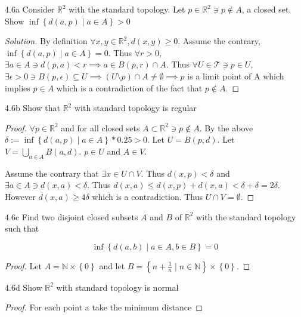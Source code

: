 \documentclass{article}
\newcommand*{\T}{\mathcal{T}}
\newcommand{\R}{\mathbb{R}}
\newcommand{\N}{\mathbb{N}}
\newenvironment{solution}
{\renewcommand\qedsymbol{$\blacksquare$}\begin{proof}[Solution]}
{\end{proof}}
\begin{document}
\begin{PROB}{4.6a}\label{Problem 4.6a.}
    Consider $\R^2$ with the standard topology. Let $p \in \R^2 \ni p \not \in A$, a closed set. Show $\inf\left\{ d(a, p) \mid a \in A \right\} > 0$   
\end{PROB}
\begin{solution}
    By definition $\forall x, y \in \R^2, d(x, y) \geq 0$. Assume the contrary, $\inf\left\{ d(a, p) \mid a \in A \right\} = 0$. Thus $\forall r > 0$, $\exists a \in A \ni d(p, a) < r \implies a \in B(p, r) \cap A$. Thus $\forall U \in \T \ni p \in U$, $\exists \epsilon > 0 \ni B(p, \epsilon) \subseteq U \implies (U \setminus {p}) \cap A \neq \emptyset \implies p$ is a limit point of A which implies $p \in A$ which is a contradiction of the fact that $p \not \in A$.         
\end{solution}
\begin{PROB}{4.6b}\label{Problem 4.6b.}
    Show that $\R^2$ with standard topology is regular 
\end{PROB}
\begin{proof}
    $\forall p \in \R^2$ and for all closed sets $A \subset \R^2 \ni p \not \in A$. By the above $\delta := \inf \left\{ d(a, p) \mid a \in A \right\} * 0.25 > 0$. Let $U = B(p, d)$. Let $V = \bigcup_{a \in A} B(a, d)$. $p \in U$ and $A \in V$. 
    
    Assume the contrary that $\exists x \in U \cap V$. Thus $d(x, p) < \delta$ and $\exists a \in A \ni d(x, a) < \delta$. Thus $d(x, a) \leq d(x, p) + d(x, a) < \delta + \delta = 2\delta$. However $d(x, a) \geq 4 \delta$ which is a contradiction. Thus $U \cap V = \emptyset$.     
\end{proof}
\begin{PROB}{4.6c}\label{Problem 4.6c.}
    Find two disjoint closed subsets $A$ and $B$ of $\R^2$ with the standard topology such that 
    
    \[
        \inf\left\{ d(a, b) \mid a \in A, b \in B \right\} = 0
    \] 
\end{PROB}
\begin{proof}
    Let $A = \N \times \left\{ 0 \right\}$ and let $B = \left\{ n + \frac{1}{n} \mid n \in \N \right\}\times \left\{ 0 \right\}$.   
\end{proof}
\begin{claim}{4.6d}\label{Claim 4.6d.}
    Show $\R^2$ with standard topology is normal
\end{claim}
\begin{proof}
    For each point a take the minimum distance
\end{proof}
\end{document}
